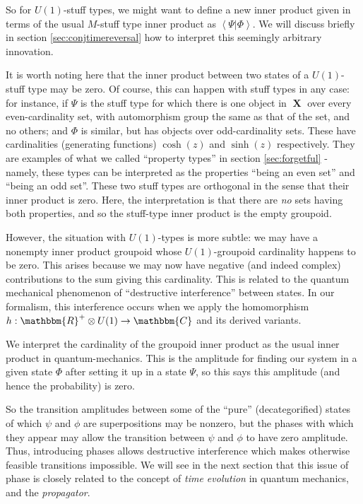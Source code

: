\documentclass{amsart} \usepackage{amsmath,amssymb,bbm}
\newcommand{\opname}[1]{\operatorname{#1}}
\newcommand{\catname}[1]{\boldsymbol{\opname{{#1}}}}
\newcommand{\UR}{\mathbbm{R}^+ \otimes U(1)}
\newcommand{\inprod}[1]{\left\langle{#1}\right\rangle}
\begin{document}
So for $U(1)$-stuff types, we might want to define a new inner product
given in terms of the usual $M$-stuff type inner product as
$\inprod{\Psi|\Phi}$.  We will discuss briefly in section
\ref{sec:conjtimereversal} how to interpret this seemingly arbitrary
innovation.

It is worth noting here that the inner product between two states of a
$U(1)$-stuff type may be zero.  Of course, this can happen with stuff
types in any case: for instance, if $\Psi$ is the stuff type for which
there is one object in $\catname{X}$ over every even-cardinality set,
with automorphism group the same as that of the set, and no others;
and $\Phi$ is similar, but has objects over odd-cardinality sets.
These have cardinalities (generating functions) $\cosh(z)$ and
$\sinh(z)$ respectively.  They are examples of what we called
``property types'' in section \ref{sec:forgetful} - namely, these
types can be interpreted as the properties ``being an even set'' and
``being an odd set''.  These two stuff types are orthogonal in the
sense that their inner product is zero.  Here, the interpretation is
that there are \textit{no} sets having both properties, and so the stuff-type
inner product is the empty groupoid.

However, the situation with $U(1)$-types is more subtle: we may have a
nonempty inner product groupoid whose $U(1)$-groupoid cardinality
happens to be zero.  This arises because we may now have negative (and
indeed complex) contributions to the sum giving this cardinality.
This is related to the quantum mechanical phenomenon of ``destructive
interference'' between states.  In our formalism, this interference
occurs when we apply the homomorphism $h: \UR \rightarrow \mathbbm{C}$
and its derived variants.

We interpret the cardinality of the groupoid inner product as the
usual inner product in quantum-mechanics.  This is the amplitude for
finding our system in a given state $\Phi$ after setting it up in a
state $\Psi$, so this says this amplitude (and hence the probability)
is zero.

So the transition amplitudes between some of the ``pure''
(decategorified) states of which $\psi$ and $\phi$ are superpositions
may be nonzero, but the phases with which they appear may allow the
transition between $\psi$ and $\phi$ to have zero amplitude.  Thus,
introducing phases allows destructive interference which makes
otherwise feasible transitions impossible.  We will see in the next
section that this issue of phase is closely related to the concept of
\textit{time evolution} in quantum mechanics, and the
\textit{propagator}.
\end{document}
